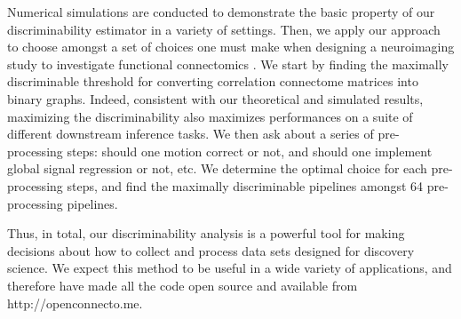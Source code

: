 \documentclass{article}
\begin{document}
Numerical simulations are conducted to demonstrate the basic property of our discriminability estimator in a variety of settings. Then, we apply our approach to choose amongst a set of choices one must make when designing a neuroimaging study to investigate functional connectomics \cite{fox2005human}\cite{biswal2010toward}. We start by finding the maximally discriminable threshold for converting correlation connectome matrices into binary graphs. Indeed, consistent with our theoretical and simulated results, maximizing the discriminability also maximizes performances on a suite of different downstream inference tasks. We then ask about a series of pre-processing steps: should one motion correct or not, and should one implement global signal regression or not, etc. We determine the optimal choice for each pre-processing steps, and find the maximally discriminable pipelines amongst 64 pre-processing pipelines.

Thus, in total, our discriminability analysis is a powerful tool for making decisions about how to collect and process data sets designed for discovery science. We expect this method to be useful in a wide variety of applications,
and therefore have made all the code open source and available from http://openconnecto.me.
\end{document}
